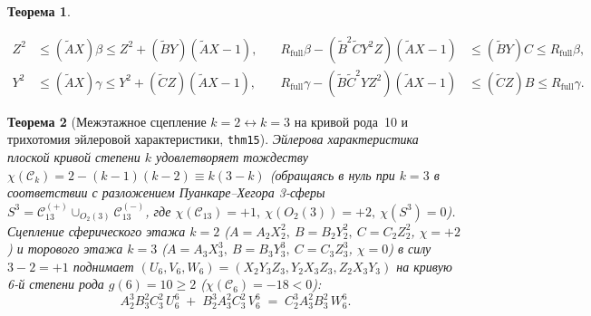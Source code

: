 \documentclass[11pt,a4paper]{article}
\theoremstyle{plain}
\newtheorem{theorem}{Теорема}[section]
\theoremstyle{definition}
\begin{document}
\begin{theorem}
\begin{enumerate}[label=\textbf{(\roman*)},leftmargin=*,noitemsep]
  \begin{equation}
    \label{eq:bilateral-bezout-height-bracket}
    \begin{aligned}
      Z^2 &\le (\widetilde{A}X)\beta \le Z^2 + (\widetilde{B}Y)(\widetilde{A}X - 1), &\quad
      R_{\mathrm{full}}\beta - (\widetilde{B}^2\widetilde{C}Y^2 Z)(\widetilde{A}X - 1) &\le (\widetilde{B}Y)C \le R_{\mathrm{full}}\beta, \\
      Y^2 &\le (\widetilde{A}X)\gamma \le Y^2 + (\widetilde{C}Z)(\widetilde{A}X - 1), &\quad
      R_{\mathrm{full}}\gamma - (\widetilde{B}\widetilde{C}^2 Y Z^2)(\widetilde{A}X - 1) &\le (\widetilde{C}Z)B \le R_{\mathrm{full}}\gamma.
    \end{aligned}
  \end{equation}
\end{enumerate}
\end{theorem}

\begin{theorem}[Межэтажное сцепление $k=2 \leftrightarrow k=3$ на кривой рода~10 и трихотомия эйлеровой характеристики, \texttt{thm15}]
\label{thm:genus-10-thm15}
Эйлерова характеристика плоской кривой степени $k$ удовлетворяет тождеству $\chi(\mathcal{C}_k) = 2 - (k-1)(k-2) \equiv k(3-k)$ (обращаясь в нуль при $k = 3$ в соответствии с разложением Пуанкаре--Хегора 3-сферы $S^3 = \mathcal{C}_{13}^{(+)}\cup_{O_2(3)}\mathcal{C}_{13}^{(-)}$, где $\chi(\mathcal{C}_{13}) = +1,\ \chi(O_2(3)) = +2,\ \chi(S^3) = 0$). Сцепление сферического этажа $k=2$ ($A = A_2 X_2^2,\ B = B_2 Y_2^2,\ C = C_2 Z_2^2$, $\chi=+2$) и торового этажа $k=3$ ($A = A_3 X_3^3,\ B = B_3 Y_3^3,\ C = C_3 Z_3^3$, $\chi=0$) в силу $3-2=+1$ поднимает $(U_6,V_6,W_6) = (X_2 Y_3 Z_3, Y_2 X_3 Z_3, Z_2 X_3 Y_3)$ на кривую 6-й степени рода $g(6) = 10 \ge 2$ ($\chi(\mathcal{C}_6) = -18 < 0$):
\begin{equation}
  \label{eq:genus-10-curve}
  A_2^3 B_3^2 C_3^2\,U_6^6 \;+\; B_2^3 A_3^2 C_3^2\,V_6^6 \;=\; C_2^3 A_3^2 B_3^2\,W_6^6.
\end{equation}
\end{theorem}
\end{document}
